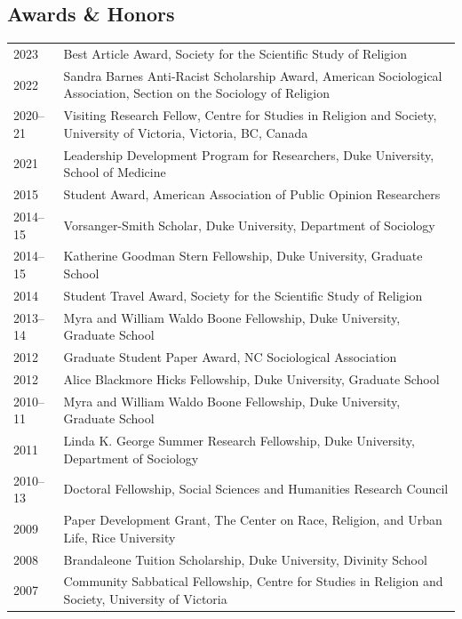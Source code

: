 \subsection*{Awards \& Honors}

\begin{longtable}{p{} p{}}
2023 & Best Article Award, Society for the Scientific Study of Religion\\
2022  & Sandra Barnes Anti-Racist Scholarship Award, American Sociological Association, Section on the Sociology of Religion\\
2020--21 & Visiting Research Fellow, Centre for Studies in Religion and Society, University of Victoria, Victoria, BC, Canada \\
2021 & Leadership Development Program for Researchers, Duke University, School of Medicine\\
2015 & Student Award, American Association of Public Opinion Researchers\\
2014--15 & Vorsanger-Smith Scholar, Duke University, Department of Sociology\\
2014--15 & Katherine Goodman Stern Fellowship, Duke University, Graduate School\\
2014 & Student Travel Award, Society for the Scientific Study of Religion\\
2013--14 & Myra and William Waldo Boone Fellowship, Duke University, Graduate School\\
2012 & Graduate Student Paper Award, NC Sociological Association\\
2012 & Alice Blackmore Hicks Fellowship, Duke University, Graduate School\\
2010--11 & Myra and William Waldo Boone Fellowship, Duke University, Graduate School\\
2011 & Linda K. George Summer Research Fellowship, Duke University, Department of Sociology\\
2010--13 & Doctoral Fellowship, Social Sciences and Humanities Research Council\\
2009 & Paper Development Grant, The Center on Race, Religion, and Urban Life, Rice University\\
2008 & Brandaleone Tuition Scholarship, Duke University, Divinity School\\
2007 & Community Sabbatical Fellowship, Centre for Studies in Religion and Society, University of Victoria\\
\end{longtable}
